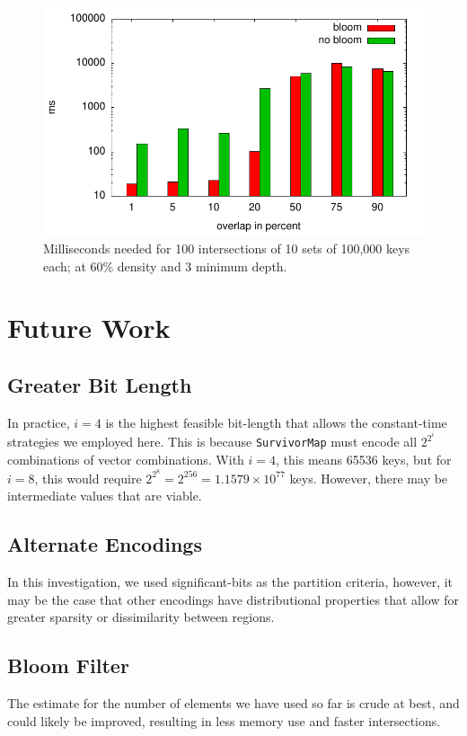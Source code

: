 \documentclass[11pt,letterpaper]{article}
\begin{document}
\begin{figure}[t]
\center
\includegraphics[width=0.98\linewidth]{../data/overlap.pdf}
\caption{Milliseconds needed for 100 intersections of 10 sets of
  100,000 keys each; at 60\% density and 3 minimum depth.}
\label{fig_overlap}
\end{figure}



\section{Future Work}
\subsection{Greater Bit Length}
In practice, $i=4$ is the highest feasible bit-length that allows the constant-time
strategies we employed here.  This is because {\tt SurvivorMap} must encode
all $2^{2^i}$ combinations of vector combinations.  With $i=4$, this means
65536 keys, but for $i=8$, this would require $2^{2^8}=2^{256}=1.1579\times10^{77}$
keys.  However, there may be intermediate values that are viable.

\subsection{Alternate Encodings}
In this investigation, we used significant-bits as the partition criteria,
however, it may be the case that other encodings have distributional properties
that allow for greater sparsity or dissimilarity between regions.

\subsection{Bloom Filter}
The estimate for the number of elements we have used so far is crude
at best, and could likely be improved, resulting in less memory use
and faster intersections.
\end{document}
